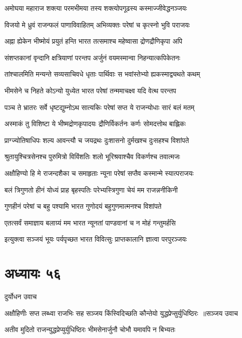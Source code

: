 \twolineshloka
{अमोघया महाराज शक्त्या परमभीमया}
{तस्य शक्त्योपगूढस्य कस्माज्जीवेद्धनञ्जयः}


\threelineshloka
{विजयो मे ध्रुवं राजन्फलं पाणाविवाहितम्}
{अभिव्यक्तः परेषां च कृत्स्नो भुवि पराजयः}
{}


\twolineshloka
{अह्ना ह्येकेन भीष्मोयं प्रयुतं हन्ति भारत}
{तत्समाश्च महेष्वासा द्रोणद्रौणिकृपा अपि}


\twolineshloka
{संशप्तकानां वृन्दानि क्षत्रियाणां परन्तप}
{अर्जुनं वयमस्मान्वा निहन्यात्कपिकेतनः}


\twolineshloka
{तांश्चालमिति मन्यन्ते सव्यसाचिवधे धृताः}
{पार्थिवाः स भवांस्तेभ्यो ह्यकस्माद्व्यथते कथम्}


\twolineshloka
{भीमसेने च निहते कोऽन्यो युध्येत भारत}
{परेषां तन्ममाचक्ष्व यदि वेत्थ परन्तप}


\twolineshloka
{पञ्च ते भ्रातरः सर्वे धृष्टद्युम्नोऽथ सात्यकिः}
{परेषां सप्त ये राजन्योधाः सारं बलं मतम्}


\twolineshloka
{अस्माकं तु विशिष्टा ये भीष्मद्रोणकृपादयः}
{द्रौणिर्विकर्तनः कर्णः सोमदत्तोथ बाह्लिकः}


\twolineshloka
{प्राग्ज्योतिषाधिपः शल्य आवन्त्यौ च जयद्रथः}
{दुःशासनो दुर्मखश्च दुःसहश्च विशांपते}


\twolineshloka
{श्रुतायुश्चित्रसेनश्च पुरुमित्रो विविंशतिः}
{शलो भूरिश्रवाश्चैव विकर्णश्च तवात्मजः}


\twolineshloka
{अक्षौहिण्यो हि मे राजन्दशैका च समाहृताः}
{न्यूना परेषां सप्तैव कस्मान्मे स्यात्पराजयः}


\twolineshloka
{बलं त्रिगुणतो हीनं योध्यं प्राह बृहस्पतिः}
{परेभ्यस्त्रिगुणा चेयं मम राजन्ननीकिनी}


\twolineshloka
{गुणहीनं परेषां च बहु पश्यामि भारत}
{गुणोदयं बहुगुणमात्मनश्च विशांपते}


\twolineshloka
{एतत्सर्वं समाज्ञाय बलाग्र्यं मम भारत}
{न्यूनतां पाण्डवानां च न मोहं गन्तुमर्हसि}


\twolineshloka
{इत्युक्त्वा सञ्जयं भूयः पर्यपृच्छत भारत}
{विवित्सुः प्राप्तकालानि ज्ञात्वा परपुरञ्जयः}


\chapter{अध्यायः ५६}
\twolineshloka
{दुर्योधन उवाच}
{}


\threelineshloka
{अक्षौहिणीः सप्त लब्ध्वा राजभिः सह सञ्जय}
{किंस्विदिच्छति कौन्तेयो युद्धप्रेप्सुर्युधिष्ठिरः ॥सञ्जय उवाच}
{}


\twolineshloka
{अतीव मुदितो राजन्युद्धप्रेप्युर्युधिष्ठिरः}
{भीमसेनार्जुनौ चोभौ यमावपि न बिभ्यतः}


